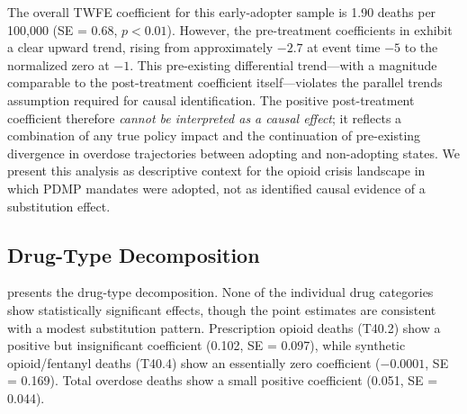 \documentclass[12pt]{article}
\begin{document}
The overall TWFE coefficient for this early-adopter sample is 1.90 deaths per 100,000 (SE = 0.68, $p < 0.01$). However, the pre-treatment coefficients in  exhibit a clear upward trend, rising from approximately $-2.7$ at event time $-5$ to the normalized zero at $-1$. This pre-existing differential trend---with a magnitude comparable to the post-treatment coefficient itself---violates the parallel trends assumption required for causal identification. The positive post-treatment coefficient therefore \textit{cannot be interpreted as a causal effect}; it reflects a combination of any true policy impact and the continuation of pre-existing divergence in overdose trajectories between adopting and non-adopting states. We present this analysis as descriptive context for the opioid crisis landscape in which PDMP mandates were adopted, not as identified causal evidence of a substitution effect.

\subsection{Drug-Type Decomposition}

 presents the drug-type decomposition. None of the individual drug categories show statistically significant effects, though the point estimates are consistent with a modest substitution pattern. Prescription opioid deaths (T40.2) show a positive but insignificant coefficient (0.102, SE = 0.097), while synthetic opioid/fentanyl deaths (T40.4) show an essentially zero coefficient ($-0.0001$, SE = 0.169). Total overdose deaths show a small positive coefficient (0.051, SE = 0.044).
\end{document}
